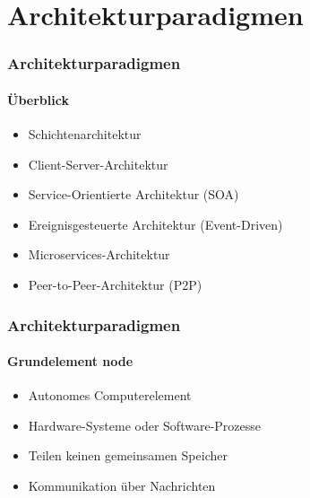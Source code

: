 \section{Architekturparadigmen}
\begin{frame}
  \frametitle{Architekturparadigmen}
  \framesubtitle{Überblick}
  \begin{itemize}
    \item Schichtenarchitektur
    \item Client-Server-Architektur
    \item Service-Orientierte Architektur (SOA)
    \item Ereignisgesteuerte Architektur (Event-Driven)
    \item Microservices-Architektur
    \item Peer-to-Peer-Architektur (P2P)
  \end{itemize}
\end{frame}

\begin{frame}
  \frametitle{Architekturparadigmen}
  \framesubtitle{Grundelement node}
  \begin{itemize}
    \item Autonomes Computerelement
    \item Hardware-Systeme oder Software-Prozesse
    \item Teilen keinen gemeinsamen Speicher
    \item Kommunikation über Nachrichten 
  \end{itemize}
\end{frame}